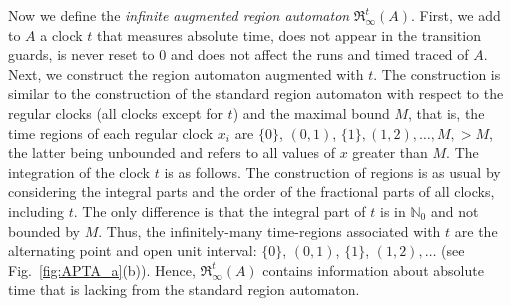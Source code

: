 \documentclass[11pt]{amsart}
\theoremstyle{definition}
\newcommand{\IARRR}{\mathfrak{R}_{\infty}^{t}}
\newcommand{\ZNaturals}{\mathbb{N}_0}
\begin{document}
Now we define the \emph{infinite augmented region automaton} $\IARRR(A)$.
First, we add to $A$ a clock $t$ that measures absolute time, does not appear in the transition guards, is never reset to $0$ and does not affect the runs and timed traced of $A$.
Next, we construct the region automaton augmented with $t$.
The construction is similar to the construction of the standard region automaton with respect to the regular clocks (all clocks except for $t$) and the maximal bound $M$, that is, the time regions of each regular clock $x_i$ are $\{0\}$, $(0,1)$, $\{1\},(1,2), \ldots, M, >M$, the latter being unbounded and refers to all values of $x$ greater than $M$.
The integration of the clock $t$ is as follows. The construction of regions is as usual by considering the integral parts and the order of the fractional parts of all clocks, including $t$. The only difference is that the integral part of $t$ is in $\ZNaturals$ and not bounded by $M$. Thus, the infinitely-many time-regions associated with $t$ are the alternating point and open unit interval: $\{0\}$, $(0,1)$, $\{1\}$, $(1,2), \ldots$ (see Fig.~\ref{fig:APTA_a}(b)).
Hence,  $\IARRR(A)$ contains information about absolute time that is lacking from the standard region automaton.
\end{document}
